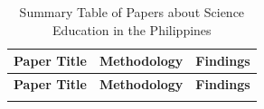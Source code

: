 
\begin{longtable}{|p{}|p{}|p{}|}
\hline
\textbf{Paper Title} & \textbf{Methodology} & \textbf{Findings} \\
\hline
\endfirsthead

\hline
\textbf{Paper Title} & \textbf{Methodology} & \textbf{Findings} \\
\hline
\endhead

\hline
\endfoot


\caption{Summary Table of Papers about Science Education in the Philippines}
\label{tab:science_education}
\end{longtable}
